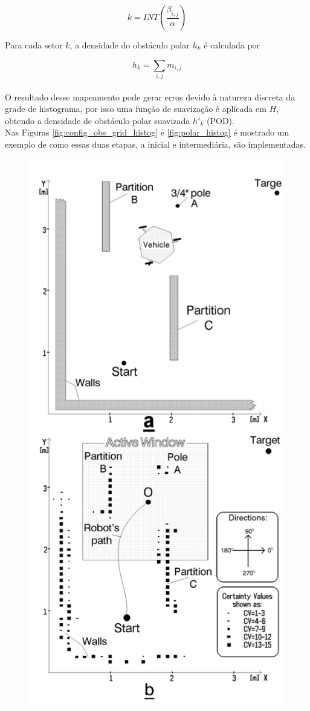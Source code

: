 $$k = INT(\frac{\beta_{i,j}}{\alpha})$$

Para cada setor $k$, a densidade do obstáculo polar $h_{k}$ é calculada por

$$h_{k} = \sum_{i,j} m_{i,j}$$
\\

O resultado desse mapeamento pode gerar erros devido à natureza discreta da grade de histograma, por isso uma função de suavização é aplicada em $H$, obtendo a densidade de obstáculo polar suavizada $h'_{k}$ (POD).
\\

Nas Figuras \ref{fig:config_obs_grid_histog} e \ref{fig:polar_histog} é mostrado um exemplo de como essas duas etapas, a inicial e intermediária, são implementadas.

\begin{figure}[H]
\centering
\begin{minipage}{.5\textwidth}
  \centering
  \includegraphics[width=.8\linewidth]{img/config_obs_grid_histog}

\end{minipage}
\end{figure}
